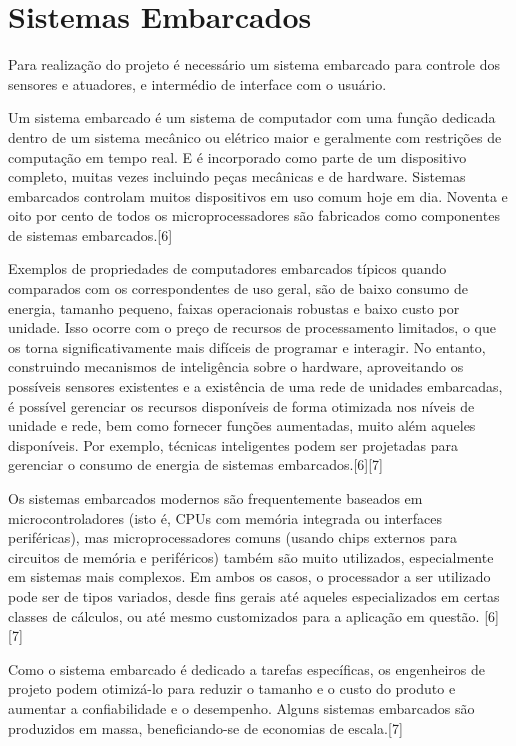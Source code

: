 \section{Sistemas Embarcados}

Para realização do projeto é necessário um sistema embarcado para controle dos sensores e atuadores, e intermédio de interface com o usuário.

Um sistema embarcado é um sistema de computador com uma função dedicada dentro de um sistema mecânico ou elétrico maior e geralmente com restrições de computação em tempo real. E é incorporado como parte de um dispositivo completo, muitas vezes incluindo peças mecânicas e de hardware. Sistemas embarcados controlam muitos dispositivos em uso comum hoje em dia. Noventa e oito por cento de todos os microprocessadores são fabricados como componentes de sistemas embarcados\cite{heath2003}.[6]

Exemplos de propriedades de computadores embarcados típicos quando comparados com os correspondentes de uso geral, são de baixo consumo de energia, tamanho pequeno, faixas operacionais robustas e baixo custo por unidade. Isso ocorre com o preço de recursos de processamento limitados, o que os torna significativamente mais difíceis de programar e interagir. No entanto, construindo mecanismos de inteligência sobre o hardware, aproveitando os possíveis sensores existentes e a existência de uma rede de unidades embarcadas, é possível gerenciar os recursos disponíveis de forma otimizada nos níveis de unidade e rede, bem como fornecer funções aumentadas, muito além aqueles disponíveis. Por exemplo, técnicas inteligentes podem ser projetadas para gerenciar o consumo de energia de sistemas embarcados\cite{heath2003}\cite{michael2007}.[6][7]

Os sistemas embarcados modernos são frequentemente baseados em microcontroladores (isto é, CPUs com memória integrada ou interfaces periféricas), mas microprocessadores comuns (usando chips externos para circuitos de memória e periféricos) também são muito utilizados, especialmente em sistemas mais complexos. Em ambos os casos, o processador a ser utilizado  pode ser de tipos variados, desde fins gerais até aqueles especializados em certas classes de cálculos, ou até mesmo customizados para a aplicação em questão\cite{heath2003}\cite{michael2007}. [6][7]

Como o sistema embarcado é dedicado a tarefas específicas, os engenheiros de projeto podem otimizá-lo para reduzir o tamanho e o custo do produto e aumentar a confiabilidade e o desempenho. Alguns sistemas embarcados são produzidos em massa, beneficiando-se de economias de escala\cite{michael2007}.[7]

